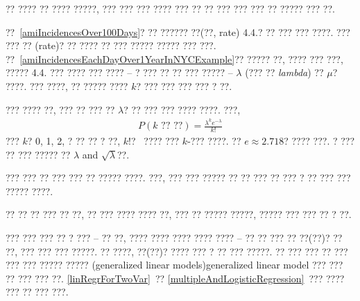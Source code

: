 ?? ???? ?? ???? ?????, ??? ??? ??? ???? ??? ?? ?? ??? ??? ??? ?? ????? ??? ??. 

??~\ref{amiIncidencesOver100Days}? ?? ?????? ??(??, rate) 4.4.? ?? ??? ??? ????. ??? ??? ?? (rate)? ?? ???? ?? ??? ????? ????? ??? ???.  ??~\ref{amiIncidencesEachDayOver1YearInNYCExample}?? ????? ??, ???? ??? ???, ????? 4.4. ??? ???? ??? ???? -- ? ??? ?? ?? ??? ????? -- $\lambda$
(??? ?? \emph{lambda})  ?? $\mu$? ????. ??? ????, ?? ????? ???? $k$? ??? ??? ??? ??? ? ??.

\begin{termBox}{
??? ???? ??, ??? ?? ??? ?? $\lambda$? ?? ??? ??? ???? ????. ???,
\begin{align*}
P(\text{$k$ ?? ??}) = \frac{\lambda^{k} e^{-\lambda}}{k!}
\end{align*}
??? $k$? 0, 1, 2, ? ?? ?? ? ??, $k!$? \pageref{factorialDefinitionInTheBinomialSection}~???? ??? $k$-??? ????. ?? $e\approx2.718$? ???? ???. ? ??? ?? ??? ????? ?? $\lambda$ and $\sqrt{\lambda}$??.}
\end{termBox}

??? ??? ?? ??? ??? ?? ????? ????. ???, ??? ??? ????? ?? ?? ??? ?? ??? ? ?? ??? ??? ????? ????.

\begin{tipBox}{
?? ?? ?? ??? ?? ??, ?? ??? ???? ???? ??, ??? ?? ????? ?????, ????? ??? ??? ?? ? ??.}
\end{tipBox}

??? ??? ??? ?? ? ??? -- ?? ??, ???? ???? ???? ???? ???? -- ?? ?? ??? ?? ??(??)? ?? ??, ??? ??? ??? ?????. ?? ????, ??(??)? ???? ??? ? ?? ??? ?????. ?? ??? ??? ?? ??? ??? ??? ????? ????? (generalized linear models){generalized linear model} ??? ??? ?? ??? ??? ??. \ref{linRegrForTwoVar}~?? \ref{multipleAndLogisticRegression}~??? ???? ??? ?? ??? ???.




